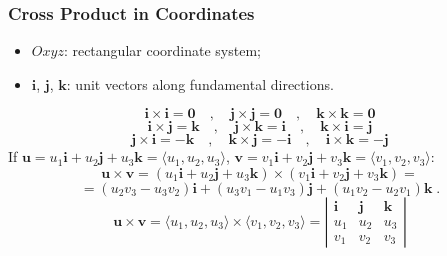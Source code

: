 \begin{frame}
 \frametitle{Cross Product in Coordinates}

\begin{itemize}
 \item  $Oxyz$: rectangular coordinate system;
  \item $\textbf{i}$, $\textbf{j}$, $\textbf{k}$: unit vectors along fundamental directions.\pause
\end{itemize}
%
$$\textbf{i} \times \textbf{i} = \textbf{0} \quad , \quad \textbf{j} \times \textbf{j} =
\textbf{0} \quad , \quad \textbf{k} \times \textbf{k} = \textbf{0}$$
$$\textbf{i} \times \textbf{j} = \textbf{k} \quad , \quad \textbf{j} \times \textbf{k} =
\textbf{i} \quad , \quad \textbf{k} \times \textbf{i} = \textbf{j}$$
$$\textbf{j} \times \textbf{i} = -\textbf{k} \quad , \quad \textbf{k} \times \textbf{j} =
-\textbf{i} \quad , \quad \textbf{i} \times \textbf{k} = -\textbf{j}$$
\pause
If $\textbf{u} = u_1 \textbf{i} + u_2 \textbf{j} + u_3 \textbf{k} = \langle u_1, u_2, u_3 \rangle$,
 $\textbf{v}=v_1 \textbf{i} + v_2 \textbf{j} + v_3 \textbf{k} = \langle v_1, v_2, v_3 \rangle$:
%
$$\textbf{u} \times \textbf{v} = (u_1 \textbf{i} + u_2 \textbf{j} + u_3 \textbf{k})
\times (v_1 \textbf{i} + v_2 \textbf{j} + v_3 \textbf{k})= $$
%
$$= (u_2v_3 -u_3v_2) \textbf{i} + (u_3v_1-u_1v_3) \textbf{j} + (u_1v_2-u_2v_1) \textbf{k} \; .$$
\pause
$$\textbf{u} \times \textbf{v} = \langle u_1, u_2, u_3 \rangle \times \langle v_1, v_2, v_3 \rangle =
\left|  \begin{array}{ccc}
      \textbf{i} & \textbf{j} & \textbf{k} \\
      u_1 & u_2 & u_3 \\
      v_1 & v_2 & v_3
        \end{array}
\right|$$
\end{frame}